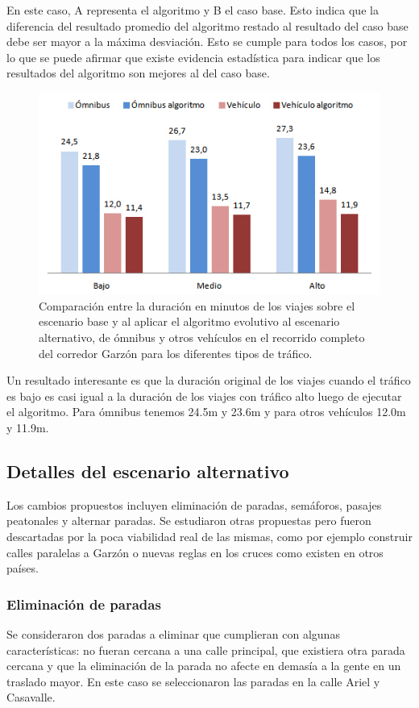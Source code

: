 En este caso, A representa el algoritmo y B el caso base. Esto indica que la diferencia del resultado promedio del algoritmo restado al resultado del caso base debe ser mayor a la máxima desviación. Esto se cumple para todos los casos, por lo que se puede afirmar  que existe evidencia estadística para indicar que los resultados del algoritmo son mejores al del caso base.

\begin{figure}[H]
	\centering
	\includegraphics[width=0.8\linewidth]{Figures/duracion_viajes}
	\caption[Comparación de la duración en minutos de los viajes sobre el escenario base y al aplicar el algoritmo evolutivo.]{Comparación entre la duración en minutos de los viajes sobre el escenario base y al aplicar el algoritmo evolutivo al escenario alternativo, de ómnibus y otros vehículos en el recorrido completo del corredor Garzón para los diferentes tipos de tráfico.}
	\label{fig:duracion_viajes}
\end{figure}

Un resultado interesante es que la duración original de los viajes cuando el tráfico es bajo es casi igual a la duración de los viajes con tráfico alto luego de ejecutar el algoritmo.
Para ómnibus tenemos 24.5m y 23.6m y  para otros vehículos 12.0m y 11.9m.

\subsection{Detalles del escenario alternativo}
Los cambios propuestos incluyen eliminación de paradas, semáforos, pasajes peatonales y alternar paradas. Se estudiaron otras propuestas pero fueron descartadas por la poca viabilidad real de las mismas, como por ejemplo construir calles paralelas a Garzón o nuevas reglas en los cruces como existen en otros países.

\subsubsection{Eliminación de paradas}
Se consideraron dos paradas a eliminar que cumplieran con algunas características: no fueran cercana a una calle principal, que existiera otra parada cercana y que la eliminación de la parada no afecte en demasía a la gente en un traslado mayor. En este caso se seleccionaron las paradas en la calle Ariel y Casavalle.

